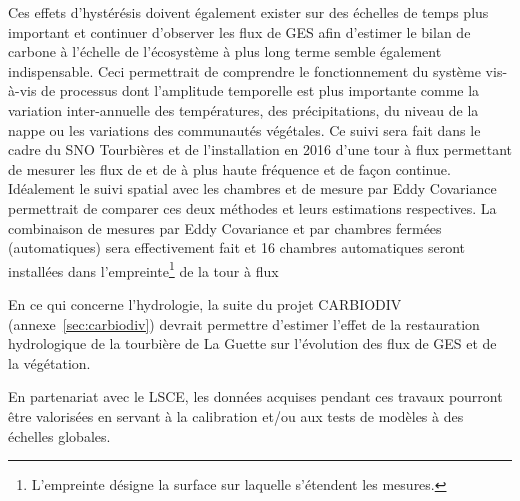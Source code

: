Ces effets d'hystérésis doivent également exister sur des échelles de temps plus important et continuer d'observer les flux de GES afin d'estimer le bilan de carbone à l'échelle de l'écosystème à plus long terme semble également indispensable.
Ceci permettrait de comprendre le fonctionnement du système vis-à-vis de processus dont l'amplitude temporelle est plus importante comme la variation inter-annuelle des températures, des précipitations, du niveau de la nappe ou les variations des communautés végétales.
Ce suivi sera fait dans le cadre du SNO Tourbières et de l'installation en 2016 d'une tour à flux permettant de mesurer les flux de \coo et de \chh à plus haute fréquence et de façon continue.
Idéalement le suivi spatial avec les chambres et de mesure par Eddy Covariance permettrait de comparer ces deux méthodes et leurs estimations respectives. 
La combinaison de mesures par Eddy Covariance et par chambres fermées (automatiques) sera effectivement fait et 16 chambres automatiques seront installées dans l'empreinte\footnote{L'empreinte désigne la surface sur laquelle s'étendent les mesures.} de la tour à flux

En ce qui concerne l'hydrologie, la suite du projet CARBIODIV (annexe~\ref{sec:carbiodiv}) devrait permettre d'estimer l'effet de la restauration hydrologique de la tourbière de La Guette sur l'évolution des flux de GES et de la végétation.

En partenariat avec le LSCE, les données acquises pendant ces travaux pourront être valorisées en servant à la calibration et/ou aux tests de modèles à des échelles globales.







%
%
%
%


%
%


